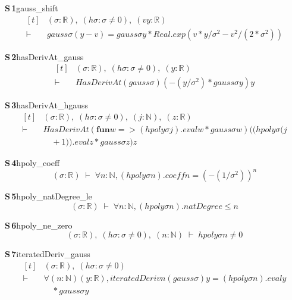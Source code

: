 \documentclass[conference]{IEEEtran}
\theoremstyle{definition}
\newcommand{\lean}[1]{\textsf{\footnotesize #1}}
\begin{document}
\noindent\textbf{S\,1}\quad\lean{gauss\_shift}
{\footnotesize\[ \begin{aligned}[t]
&(\sigma : \mathbb{R} ),\; (\mathit{hσ} : \sigma \neq 0),\; (\mathit{v} \mathit{y} : \mathbb{R} )\\
\vdash\;&\mathit{gauss} \sigma (\mathit{y} - \mathit{v}) = \mathit{gauss} \sigma \mathit{y} * \mathit{Real}.\mathit{exp} (\mathit{v} * \mathit{y} / \sigma ^{2} - \mathit{v} ^{2} / (2 * \sigma ^{2}))
\end{aligned} \]}

\noindent\textbf{S\,2}\quad\lean{hasDerivAt\_gauss}
{\footnotesize\[ \begin{aligned}[t]
&(\sigma : \mathbb{R} ),\; (\mathit{hσ} : \sigma \neq 0),\; (\mathit{y} : \mathbb{R} )\\
\vdash\;&\mathit{HasDerivAt} (\mathit{gauss} \sigma ) (-(\mathit{y} / \sigma ^{2}) * \mathit{gauss} \sigma \mathit{y}) \mathit{y}
\end{aligned} \]}

\noindent\textbf{S\,3}\quad\lean{hasDerivAt\_hgauss}
{\footnotesize\[ \begin{aligned}[t]
&(\sigma : \mathbb{R} ),\; (\mathit{hσ} : \sigma \neq 0),\; (\mathit{j} : \mathbb{N} ),\; (\mathit{z} : \mathbb{R} )\\
\vdash\;&\mathit{HasDerivAt} (\mathbf{fun} \mathit{w} => (\mathit{hpoly} \sigma \mathit{j}).\mathit{eval} \mathit{w} * \mathit{gauss} \sigma \mathit{w}) ((\mathit{hpoly} \sigma (\mathit{j}\\
&\quad + 1)).\mathit{eval} \mathit{z} * \mathit{gauss} \sigma \mathit{z}) \mathit{z}
\end{aligned} \]}

\noindent\textbf{S\,4}\quad\lean{hpoly\_coeff}
{\footnotesize\[ (\sigma : \mathbb{R} ) \;\vdash\; \forall \mathit{n} : \mathbb{N} , (\mathit{hpoly} \sigma \mathit{n}).\mathit{coeff} \mathit{n} = (-(1 / \sigma ^{2})) ^{\mathit{n}} \]}

\noindent\textbf{S\,5}\quad\lean{hpoly\_natDegree\_le}
{\footnotesize\[ (\sigma : \mathbb{R} ) \;\vdash\; \forall \mathit{n} : \mathbb{N} , (\mathit{hpoly} \sigma \mathit{n}).\mathit{natDegree} \leq \mathit{n} \]}

\noindent\textbf{S\,6}\quad\lean{hpoly\_ne\_zero}
{\footnotesize\[ (\sigma : \mathbb{R} ),\; (\mathit{hσ} : \sigma \neq 0),\; (\mathit{n} : \mathbb{N} ) \;\vdash\; \mathit{hpoly} \sigma \mathit{n} \neq 0 \]}

\noindent\textbf{S\,7}\quad\lean{iteratedDeriv\_gauss}
{\footnotesize\[ \begin{aligned}[t]
&(\sigma : \mathbb{R} ),\; (\mathit{hσ} : \sigma \neq 0)\\
\vdash\;&\forall (\mathit{n} : \mathbb{N} ) (\mathit{y} : \mathbb{R} ), \mathit{iteratedDeriv} \mathit{n} (\mathit{gauss} \sigma ) \mathit{y} = (\mathit{hpoly} \sigma \mathit{n}).\mathit{eval} \mathit{y}\\
&\quad * \mathit{gauss} \sigma \mathit{y}
\end{aligned} \]}
\end{document}

